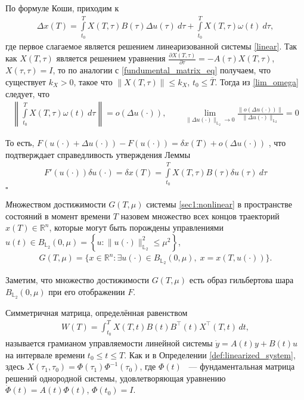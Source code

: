 \documentclass[../main.tex]{subfiles}
\begin{document}
	По формуле Коши, приходим к 
	\begin{gather*}
		\Delta x(T) = \int\limits_{t_0}^{T} X(T, \tau) B(\tau) \Delta u(\tau) \ d\tau + \int\limits_{t_0}^{T}  X(T, \tau) \omega(t) \ d\tau,
	\end{gather*}
	где первое слагаемое является решением линеаризованной системы \eqref{linear}.
	Так как $X(T, \tau) $ является решением уравнения $\frac{\partial X(T, \tau) }{\partial \tau} = -A(\tau)X(T, \tau)$, $X(\tau, \tau) = I$, то по аналогии с \eqref{fundumental_matrix_eq}  получаем, что существует $k_X > 0$, такое что $\|X(T, \tau) \| \leqslant k_X$, $t_0 \leqslant \overline{T} $. Тогда из \eqref{lim_omega} следует, что 
	\begin{gather*}
		\left\|\int\limits_{t_0}^{T}  X(T, \tau) \omega(t) \ d\tau  \right\| = o(\Delta u(\cdot)), \qquad \lim\limits_{\|\Delta u(\cdot) \|_{\mathbb{L}_2} \to 0}  \frac{ \| o(\Delta u(\cdot)) \| }{\|\Delta u(\cdot) \|_{\mathbb{L}_2}}  = 0
	\end{gather*}
	
	То есть, $F(u(\cdot) + \Delta u(\cdot)) - F(u(\cdot)) = \delta x(T) + o(\Delta u(\cdot))$ , что подтверждает справедливость утверждения Леммы
	\begin{gather}\label{lem2_assert}
		  F'(u(\cdot))\delta u(\cdot) =\delta x(T) = \int\limits_{t_0}^{T} X(T, \tau) B(\tau) \delta u(\tau) \ d\tau
	\end{gather}
	\hfill $\square$
	
	\begin{definition}
		{\textit  Множеством достижимости} $ G(T,\mu) $ системы \eqref{sec1:nonlinear} в пространстве состояний в момент времени $ T $ назовем множество всех концов траекторий $ x(T) \in \mathbb{R}^n $,  которые могут быть порождены управлениями	$ u(t) \in B_{\mathbb{L}_2}(0,\mu) =\left\lbrace u:\lVert u(\cdot)\rVert^2_{\mathbb{L}_2} \leqslant \mu^2\right\rbrace  $,
		\begin{gather*}
			G(T,\mu)=\{x\in \mathbb{R}^n:\exists u(\cdot)\in B_{\mathbb{L}_2}(0,\mu),\; x=x(T,u(\cdot))\}.
		\end{gather*}
	\end{definition}
	
	Заметим, что множество достижимости $G(T,\mu)$ есть образ гильбертова шара $B_{\mathbb{L}_2}(0,\mu)$ при его отображении $F$.
	
	\begin{definition}\label{def:Grammian}
		Симметричная матрица, определённая равенством
		\begin{gather*}
			W(T) = \int_{t_0}^{T}X(T,t)B(t)B^{\top}(t)X^{\top}(T,t) \, dt,
		\end{gather*}
		называется грамианом управляемости линейной системы $\dot{y} = A(t) y + B(t) u $ на интервале времени $  t_0 \leqslant t \leqslant T $. Как и в Определении \ref{def:linearized_system}, здесь $ X(\tau_1,\tau_0)= \Phi(\tau_1) \Phi^{-1}(\tau_0) $, где $\Phi(t) $ ~--- фундаментальная матрица решений однородной системы, удовлетворяющая уравнению $ \dot{\Phi}(t) = A(t) \Phi(t)$, $ \Phi(t_0) = I $.
	\end{definition}
	
\end{document}
